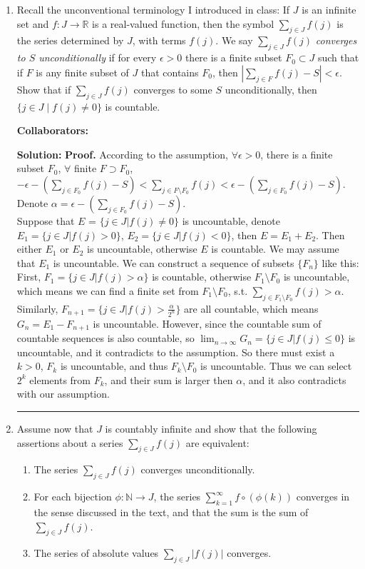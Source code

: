 \documentclass{article}%
\newenvironment{proof}[1][Proof]{\textbf{#1.} }{\ \rule{0.5em}{0.5em}}
\begin{document}
\begin{enumerate}
\item Recall the unconventional terminology I introduced in class: If $J$ is an infinite set and $f:J\to \mathbb{R}$ is a real-valued function, then the symbol $\sum_{j\in J} f(j)$ is the series determined by $J$, with terms $f(j)$.  We say $\sum_{j\in J} f(j)$ \emph{converges to $S$ unconditionally} if for every $\epsilon > 0$ there is a finite subset $F_0 \subset J$ such that if $F$ is any finite subset of $J$ that contains $F_0$, then $|\sum_{j\in F} f(j) - S|< \epsilon$. Show that if $\sum_{j\in J} f(j)$ converges to some $S$ unconditionally, then $\{j\in J \mid f(j)\neq 0\}$ is countable.

\bigskip
\textbf{Collaborators:}\\
\smallskip

\textbf{Solution:}
\begin{proof} 
According to the assumption, $\forall \epsilon > 0$, there is a finite subset $F_0$, $\forall$ finite $F\supset F_0$, $-\epsilon-(\sum_{j\in F_0}f(j)-S) < \sum_{j\in F\setminus F_0}f(j) < \epsilon-(\sum_{j\in F_0}f(j)-S)$. Denote $\alpha = \epsilon-(\sum_{j\in F_0}f(j)-S)$. \\[2pt]
Suppose that $E$ = $\{j\in J|f(j)\ne 0\}$ is uncountable, denote $E_1 = \{j\in J|f(j) > 0\}$, $E_2 = \{j\in J|f(j) < 0\}$, then $E = E_1+E_2$. Then either $E_1$ or $E_2$ is uncountable, otherwise $E$ is countable. We may assume that $E_1$ is uncountable. We can construct a sequence of subsets $\{F_n\}$ like this: \\[2pt]
First, $F_1 = \{j\in J|f(j) > \alpha\}$ is countable, otherwise $F_1\setminus F_0$ is uncountable, which means we can find a finite set from $F_1\setminus F_0$, s.t. $\sum_{j\in F_1\setminus F_0}f(j) > \alpha$. Similarly, $F_{n+1} = \{j\in J|f(j) > \frac{\alpha}{2^n}\}$ are all countable, which means $G_n = E_1 - F_{n+1}$ is uncountable. However, since the countable sum of countable sequences is also countable, so $\lim_{n\to\infty}G_n = \{j\in J|f(j)\le 0\}$ is uncountable, and it contradicts to the assumption. So there must exist a $k > 0$, $F_k$ is uncountable, and thus $F_k \setminus F_0$ is uncountable. Thus we can select $2^k$ elements from $F_k$, and their sum is larger then $\alpha$, and it also contradicts with our assumption.
\end{proof}
\bigskip

\item Assume now that $J$ is countably infinite and show that the following assertions about a series $\sum_{j\in J} f(j)$ are equivalent:
\begin{enumerate}
\item The series $\sum_{j\in J} f(j)$ converges unconditionally.
\item For each bijection $\phi:\mathbb{N}\to J$, the series $\sum_{k = 1}^{\infty} f\circ(\phi(k))$ converges in the sense discussed in the text, and that the sum is the sum of $\sum_{j\in J} f(j)$.
\item The series of absolute values $\sum_{j\in J} |f(j)|$ converges.
\end{enumerate}


\end{enumerate}
\end{document}
